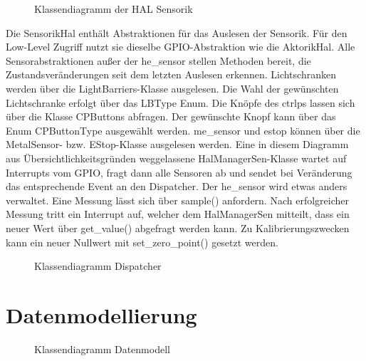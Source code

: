 \begin{figure}
    \caption{Klassendiagramm der HAL Sensorik}
    \label{fig:cd-hal-sens}
\end{figure}

Die Sensorik\-Hal enthält Abstraktionen für das Auslesen der Sensorik.
Für den Low-Level Zugriff nutzt sie dieselbe GPIO-Abstraktion wie die Aktorik\-Hal.
Alle Sensorabstraktionen außer der \gls{he_sensor} stellen Methoden bereit, die Zustandsveränderungen
seit dem letzten Auslesen erkennen.
Lichtschranken werden über die LightBarriers-Klasse ausgelesen.
Die Wahl der gewünschten Lichtschranke erfolgt über das LBType Enum.
Die Knöpfe des \gls{ctrlp}s lassen sich über die Klasse CPButtons abfragen.
Der gewünschte Knopf kann über das Enum CPButtonType ausgewählt werden.
\Gls{me_sensor} und \gls{estop} können über die MetalSensor- bzw. EStop-Klasse ausgelesen werden.
Eine in diesem Diagramm aus Übersichtlichkeitsgründen weggelassene HalManagerSen-Klasse wartet
auf Interrupts vom GPIO, fragt dann alle Sensoren ab und sendet bei Veränderung das entsprechende
Event an den Dispatcher.
Der \gls{he_sensor} wird etwas anders verwaltet. Eine Messung lässt sich über sample() anfordern.
Nach erfolgreicher Messung tritt ein Interrupt auf, welcher dem HalManagerSen mitteilt,
dass ein neuer Wert über get\_value() abgefragt werden kann.
Zu Kalibrierungszwecken kann ein neuer Nullwert mit set\_zero\_point() gesetzt werden.


\begin{figure}
    \caption{Klassendiagramm Dispatcher}
    \label{fig:cd-dispatcher}
\end{figure}


\FloatBarrier
\section{Datenmodellierung}\label{sec:datenmodellierung}

\begin{figure}
    \caption{Klassendiagramm Datenmodell}
    \label{fig:cd-datamodel}
\end{figure}



